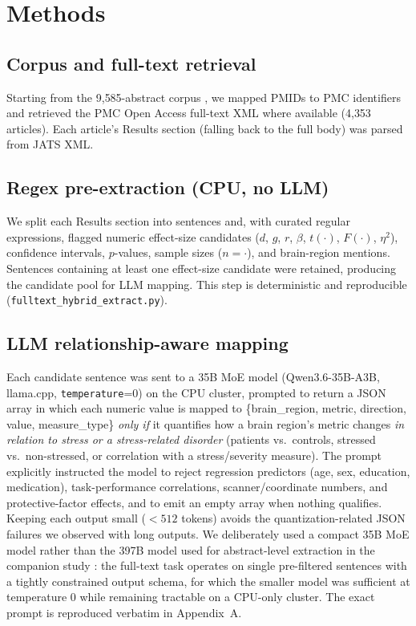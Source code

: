 \documentclass[11pt]{article}
\begin{document}
\section{Methods}

\subsection{Corpus and full-text retrieval}
Starting from the 9{,}585-abstract corpus \cite{kang2026scoping}, we mapped
PMIDs to PMC identifiers and retrieved the PMC Open Access full-text XML where
available (4{,}353 articles). Each article's Results section (falling back to the
full body) was parsed from JATS XML.

\subsection{Regex pre-extraction (CPU, no LLM)}
We split each Results section into sentences and, with curated regular
expressions, flagged numeric effect-size candidates ($d$, $g$, $r$, $\beta$,
$t(\cdot)$, $F(\cdot)$, $\eta^2$), confidence intervals, $p$-values, sample sizes
($n=\cdot$), and brain-region mentions. Sentences containing at least one
effect-size candidate were retained, producing the candidate pool for LLM
mapping. This step is deterministic and reproducible
(\texttt{fulltext\_hybrid\_extract.py}).

\subsection{LLM relationship-aware mapping}
Each candidate sentence was sent to a 35B MoE model (Qwen3.6-35B-A3B, llama.cpp,
\texttt{temperature}=0) on the CPU cluster, prompted to return a JSON array in
which each numeric value is mapped to \{brain\_region, metric, direction, value,
measure\_type\} \emph{only if} it quantifies how a brain region's metric changes
\emph{in relation to stress or a stress-related disorder} (patients vs.\
controls, stressed vs.\ non-stressed, or correlation with a stress/severity
measure). The prompt explicitly instructed the model to reject regression
predictors (age, sex, education, medication), task-performance correlations,
scanner/coordinate numbers, and protective-factor effects, and to emit an empty
array when nothing qualifies. Keeping each output small ($<512$ tokens) avoids
the quantization-related JSON failures we observed with long outputs. We
deliberately used a compact 35B MoE model rather than the 397B model used for
abstract-level extraction in the companion study \cite{kang2026scoping}: the
full-text task operates on single pre-filtered sentences with a tightly
constrained output schema, for which the smaller model was sufficient at
temperature 0 while remaining tractable on a CPU-only cluster. The exact prompt
is reproduced verbatim in Appendix~A.
\end{document}
